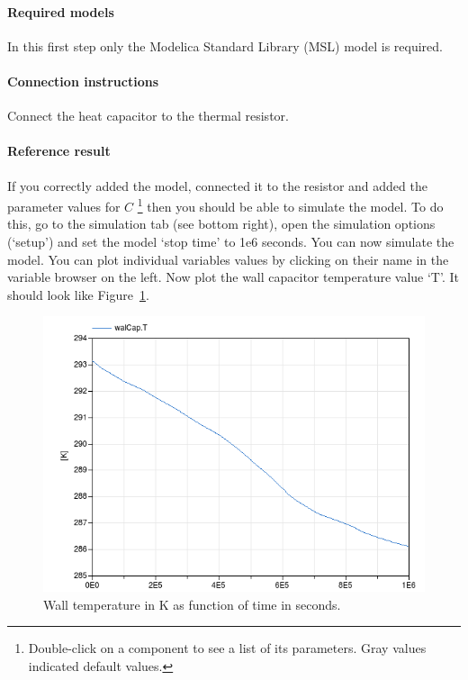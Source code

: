 \documentclass[10pt,a4paper]{article}
\begin{document}
\paragraph{Required models}
In this first step only the Modelica Standard Library (MSL) 
model 
is required.

\paragraph{Connection instructions}
Connect the heat capacitor to the thermal resistor.

\paragraph{Reference result}
If you correctly added the model, connected it to the resistor and 
added the parameter values for $C$
\footnote{Double-click on a component to see a list of its parameters. Gray values indicated default values.}
then you should be able to simulate the model.
To do this, go to the simulation tab (see bottom right),
open the simulation options (`setup')
and set the model `stop time' to 1e6 seconds.
You can now simulate the model.
You can plot individual variables values by clicking on their name in the variable browser on the left.
Now plot the wall capacitor temperature value `T'. 
It should look like Figure~\ref{fig:res1}.

\begin{figure}
\centering
\includegraphics[scale=0.6]{result1.png}
\caption{Wall temperature in K as function of time in seconds.}
\label{fig:res1}
\end{figure}
\end{document}
